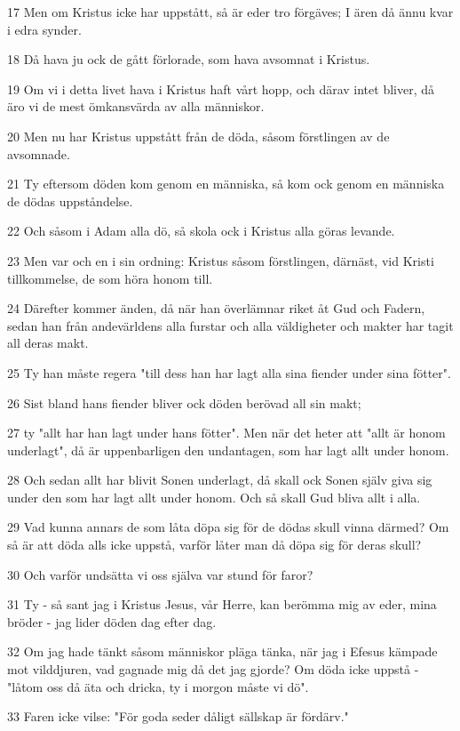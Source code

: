 \par 17 Men om Kristus icke har uppstått, så är eder tro förgäves; I ären då ännu kvar i edra synder.
\par 18 Då hava ju ock de gått förlorade, som hava avsomnat i Kristus.
\par 19 Om vi i detta livet hava i Kristus haft vårt hopp, och därav intet bliver, då äro vi de mest ömkansvärda av alla människor.
\par 20 Men nu har Kristus uppstått från de döda, såsom förstlingen av de avsomnade.
\par 21 Ty eftersom döden kom genom en människa, så kom ock genom en människa de dödas uppståndelse.
\par 22 Och såsom i Adam alla dö, så skola ock i Kristus alla göras levande.
\par 23 Men var och en i sin ordning: Kristus såsom förstlingen, därnäst, vid Kristi tillkommelse, de som höra honom till.
\par 24 Därefter kommer änden, då när han överlämnar riket åt Gud och Fadern, sedan han från andevärldens alla furstar och alla väldigheter och makter har tagit all deras makt.
\par 25 Ty han måste regera "till dess han har lagt alla sina fiender under sina fötter".
\par 26 Sist bland hans fiender bliver ock döden berövad all sin makt;
\par 27 ty "allt har han lagt under hans fötter". Men när det heter att "allt är honom underlagt", då är uppenbarligen den undantagen, som har lagt allt under honom.
\par 28 Och sedan allt har blivit Sonen underlagt, då skall ock Sonen själv giva sig under den som har lagt allt under honom. Och så skall Gud bliva allt i alla.
\par 29 Vad kunna annars de som låta döpa sig för de dödas skull vinna därmed? Om så är att döda alls icke uppstå, varför låter man då döpa sig för deras skull?
\par 30 Och varför undsätta vi oss själva var stund för faror?
\par 31 Ty - så sant jag i Kristus Jesus, vår Herre, kan berömma mig av eder, mina bröder - jag lider döden dag efter dag.
\par 32 Om jag hade tänkt såsom människor pläga tänka, när jag i Efesus kämpade mot vilddjuren, vad gagnade mig då det jag gjorde? Om döda icke uppstå - "låtom oss då äta och dricka, ty i morgon måste vi dö".
\par 33 Faren icke vilse: "För goda seder dåligt sällskap är fördärv."
